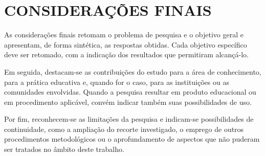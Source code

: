 
\chapter{CONSIDERAÇÕES FINAIS}
\label{cap:consideracoes}


As considerações finais retomam o problema de pesquisa e o objetivo geral e apresentam, de forma sintética, as respostas obtidas. Cada objetivo específico deve ser retomado, com a indicação dos resultados que permitiram alcançá-lo.

Em seguida, destacam-se as contribuições do estudo para a área de conhecimento, para a prática educativa e, quando for o caso, para as instituições ou as comunidades envolvidas. Quando a pesquisa resultar em produto educacional ou em procedimento aplicável, convém indicar também suas possibilidades de uso.

Por fim, reconhecem-se as limitações da pesquisa e indicam-se possibilidades de continuidade, como a ampliação do recorte investigado, o emprego de outros procedimentos metodológicos ou o aprofundamento de aspectos que não puderam ser tratados no âmbito deste trabalho.

